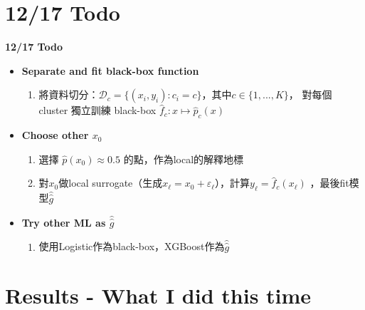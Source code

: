 \documentclass[12pt,aspectratio=43]{beamer}
\begin{document}
\section{12/17 Todo}

\begin{frame}{\textbf{12/17 Todo}}
\linespread{1.5}
  \begin{itemize}
    \item \textbf{Separate and fit black-box function}
    \begin{enumerate}[]
      \item 將資料切分：$\mathcal{D}_c=\{(x_i, y_i):c_i=c\}$，其中$c \in \{1,...,K\}$，
      對每個 cluster 獨立訓練 black-box $\hat{f}_c:x\longmapsto\hat{p}_c(x)$
    \end{enumerate}
  \end{itemize}

  \begin{itemize}
    \item \textbf{Choose other $x_0$}
    \begin{enumerate}[]
      \item 選擇 $\hat p(x_0)\approx 0.5$ 的點，作為local的解釋地標
      \item 對$x_0$做local surrogate（生成$x_{\ell}=x_0+\varepsilon_{\ell}$），計算$y_{\ell}=\hat{f}_c(x_{\ell})$
      ，最後fit模型$\hat{\hat{g}}$
    \end{enumerate}
  \end{itemize}

  \begin{itemize}
    \item \textbf{Try other ML as $\hat{\hat g}$}
    \begin{enumerate}[]
      \item 使用Logistic作為black-box，XGBoost作為$\hat{\hat g}$
    \end{enumerate}
  \end{itemize}
\end{frame}

\section{Results - What I did this time}
\end{document}
